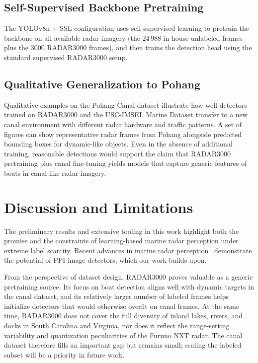 \documentclass[twocolumn, 10pt]{article}
\begin{document}
\subsection{Self-Supervised Backbone Pretraining}
The YOLOv8n + SSL configuration uses self-supervised learning to pretrain the backbone on all available radar imagery (the $24\,988$ in-house unlabeled frames plus the $3000$ RADAR3000 frames), and then trains the detection head using the standard supervised RADAR3000 setup.

\subsection{Qualitative Generalization to Pohang}
Qualitative examples on the Pohang Canal dataset illustrate how well detectors trained on RADAR3000 and the USC-IMSEL Marine Dataset transfer to a new canal environment with different radar hardware and traffic patterns. A set of figures can show representative radar frames from Pohang alongside predicted bounding boxes for dynamic-like objects. Even in the absence of additional training, reasonable detections would support the claim that RADAR3000 pretraining plus canal fine-tuning yields models that capture generic features of boats in canal-like radar imagery.

\section{Discussion and Limitations}
\label{sec:discussion}
The preliminary results and extensive tooling in this work highlight both the promise and the constraints of learning-based marine radar perception under extreme label scarcity. Recent advances in marine radar perception~\cite{zhang2023yolo_swformer, chen2021radar_ppinet} demonstrate the potential of PPI-image detectors, which our work builds upon.

From the perspective of dataset design, RADAR3000 proves valuable as a generic pretraining source. Its focus on boat detection aligns well with dynamic targets in the canal dataset, and its relatively larger number of labeled frames helps initialize detectors that would otherwise overfit on canal frames. At the same time, RADAR3000 does not cover the full diversity of inland lakes, rivers, and docks in South Carolina and Virginia, nor does it reflect the range-setting variability and quantization peculiarities of the Furuno NXT radar. The canal dataset therefore fills an important gap but remains small; scaling the labeled subset will be a priority in future work.
\end{document}
